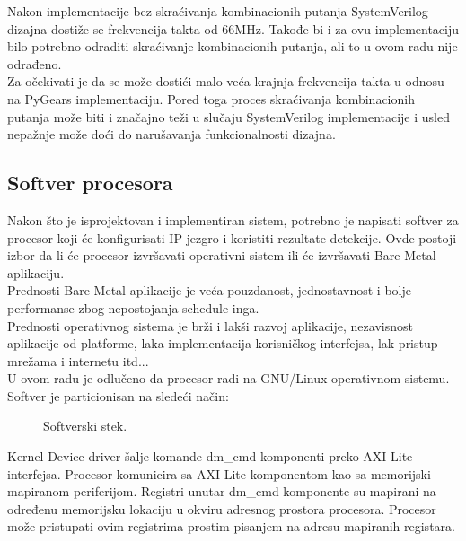 Nakon implementacije bez skraćivanja kombinacionih putanja SystemVerilog dizajna dostiže se frekvencija takta od
66MHz.
Takođe bi i za ovu implementaciju bilo potrebno odraditi skraćivanje
kombinacionih putanja, ali to u ovom radu nije odrađeno. \\
Za očekivati je da se može dostići malo veća krajnja frekvencija takta u odnosu na
PyGears implementaciju.
Pored toga proces skraćivanja kombinacionih putanja može biti i značajno teži u slučaju
SystemVerilog implementacije i usled nepažnje može doći do narušavanja
funkcionalnosti dizajna. \\

\subsection{Softver procesora}

Nakon što je isprojektovan i implementiran sistem, potrebno je napisati
softver za procesor koji će konfigurisati IP jezgro i koristiti rezultate detekcije.
Ovde postoji izbor da li će procesor izvršavati operativni sistem ili će izvršavati
Bare Metal aplikaciju. \\

Prednosti Bare Metal aplikacije je veća pouzdanost, jednostavnost i bolje performanse zbog
nepostojanja schedule-inga. \\
Prednosti operativnog sistema je brži i lakši razvoj aplikacije, nezavisnost
aplikacije od platforme, laka implementacija korisničkog interfejsa,
lak pristup mrežama i internetu itd...\\

U ovom radu je odlučeno da procesor radi na GNU/Linux operativnom sistemu. \\
Softver je particionisan na sledeći način:

\begin{figure}[H]
  \centering
  \resizebox{0.9\textwidth}{!}{%
    
  }
  \caption{Softverski stek.}
  \label{software_stack}
\end{figure}

Kernel Device driver šalje komande dm\_cmd komponenti preko AXI Lite interfejsa.
Procesor komunicira sa AXI Lite komponentom kao sa memorijski mapiranom
periferijom.
Registri unutar dm\_cmd komponente su mapirani na određenu memorijsku lokaciju u
okviru adresnog prostora procesora.
Procesor može pristupati ovim registrima prostim pisanjem na adresu mapiranih registara.\\

